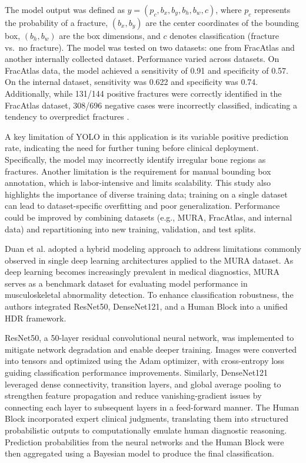 \documentclass[conference]{IEEEtran}
\begin{document}
The model output was defined as $y = (p_c, b_x, b_y, b_h, b_w, c)$, where $p_c$ represents the probability of a fracture, $(b_x, b_y)$ are the center coordinates of the bounding box, $(b_h, b_w)$ are the box dimensions, and $c$ denotes classification (fracture vs.\ no fracture). The model was tested on two datasets: one from FracAtlas and another internally collected dataset. Performance varied across datasets. On FracAtlas data, the model achieved a sensitivity of 0.91 and specificity of 0.57. On the internal dataset, sensitivity was 0.622 and specificity was 0.74. Additionally, while 131/144 positive fractures were correctly identified in the FracAtlas dataset, 308/696 negative cases were incorrectly classified, indicating a tendency to overpredict fractures \cite{Hruby2024_cross_center_medrxiv}.

A key limitation of YOLO in this application is its variable positive prediction rate, indicating the need for further tuning before clinical deployment. Specifically, the model may incorrectly identify irregular bone regions as fractures. Another limitation is the requirement for manual bounding box annotation, which is labor-intensive and limits scalability. This study also highlights the importance of diverse training data; training on a single dataset can lead to dataset-specific overfitting and poor generalization. Performance could be improved by combining datasets (e.g., MURA, FracAtlas, and internal data) and repartitioning into new training, validation, and test splits.

Duan et al. \cite{liu2022convnet2020s} adopted a hybrid modeling approach to address limitations commonly observed in single deep learning architectures applied to the MURA dataset. As deep learning becomes increasingly prevalent in medical diagnostics, MURA serves as a benchmark dataset for evaluating model performance in musculoskeletal abnormality detection. To enhance classification robustness, the authors integrated ResNet50, DenseNet121, and a Human Block into a unified HDR framework.

ResNet50, a 50-layer residual convolutional neural network, was implemented to mitigate network degradation and enable deeper training. Images were converted into tensors and optimized using the Adam optimizer, with cross-entropy loss guiding classification performance improvements. Similarly, DenseNet121 leveraged dense connectivity, transition layers, and global average pooling to strengthen feature propagation and reduce vanishing-gradient issues by connecting each layer to subsequent layers in a feed-forward manner. The Human Block incorporated expert clinical judgments, translating them into structured probabilistic outputs to computationally emulate human diagnostic reasoning. Prediction probabilities from the neural networks and the Human Block were then aggregated using a Bayesian model to produce the final classification. 
\end{document}
